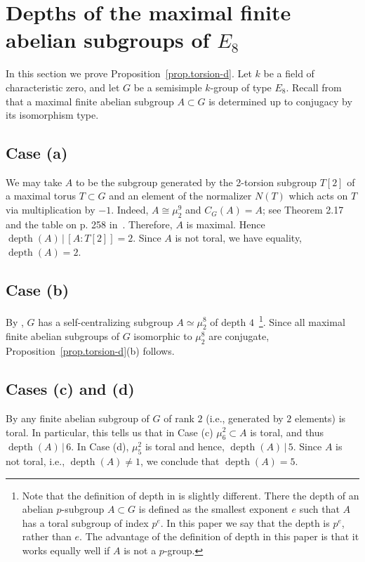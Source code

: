 \documentclass[12pt]{amsart}
\numberwithin{equation}{section}
\theoremstyle{remark}
\newcommand{\depth}{\operatorname{depth}}
\begin{document}
\section{Depths of the maximal finite abelian subgroups
of \texorpdfstring{$E_8$}{E8}}
\label{sect.conclusion}

In this section we prove Proposition~\ref{prop.torsion-d}. Let $k$ be a field of characteristic zero, and let $G$ be a semisimple $k$-group of type $E_8$. Recall from \cite{draper2017maximal} that a maximal finite abelian subgroup $A \subset G$ is determined up to conjugacy by its isomorphism type. 

\subsection{Case (a)} 
We may take $A$ to be the subgroup generated by the 2-torsion subgroup $T[2]$ of a maximal torus $T \subset G$ and an element of the normalizer $N(T)$ which acts on $T$ via multiplication by $-1$. Indeed, $A \cong \mu_2^9$ and $C_G(A) = A$; see Theorem 2.17 and the table on p. 258 in~\cite{griess1991elementary}. Therefore, $A$ is maximal. Hence $\depth(A) \, | \, [A: T[2]] = 2$. Since $A$ is not toral, we have equality, $\depth(A) = 2$.

\subsection{Case (b)} 
By \cite[Proposition 5.3]{reichstein-youssin2}, $G$ has a self-centralizing subgroup $A \simeq \mu_2^8$ of depth $4$~\footnote{Note that the definition of depth in \cite{reichstein-youssin2} is slightly different. There the depth of an abelian $p$-subgroup $A \subset G$ is defined as the smallest exponent $e$ such that $A$ has a toral subgroup of index $p^e$. In this paper we say that the depth is $p^e$, rather than $e$. The advantage of the definition of depth in this paper is that it works equally well if $A$ is not a $p$-group.}. Since all maximal finite abelian subgroups of $G$ isomorphic to $\mu_2^8$ are conjugate, Proposition~\ref{prop.torsion-d}(b) follows. 

\subsection{Cases (c) and (d)}
By \cite[Corollary 5.25(c)]{steinberg-torsion} any 
finite abelian subgroup of $G$ of rank $2$ (i.e., generated by $2$ elements) is toral. In particular, 
this tells us that in Case (c) $\mu_6^2 \subset A$ is toral, and thus $\depth(A) \, | \, 6$. In Case (d), $\mu_5^2$ is toral and hence, $\depth(A) \, | \, 5$. Since $A$ is not toral, i.e., 
$\depth(A) \neq 1$, we conclude that $\depth(A) = 5$.
\end{document}
